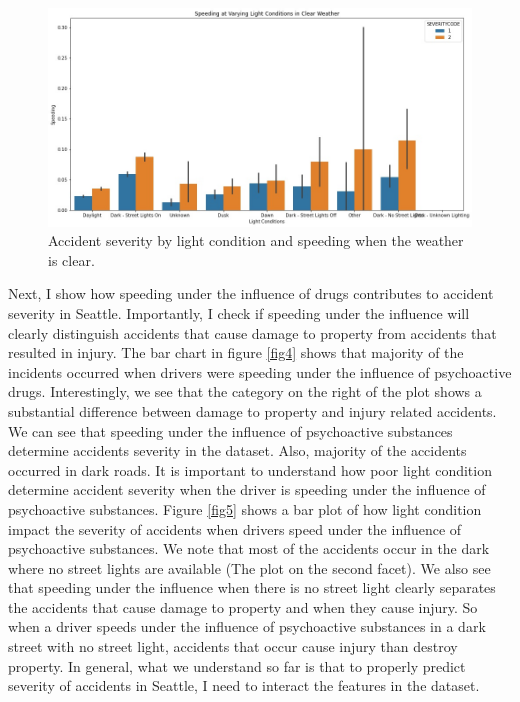 \documentclass[a4paper,12pt]{article}
\begin{document}
\begin{figure}[H]
	\centering
	\includegraphics[width=1.0\textwidth]{li_sp_wet.jpg}
	\caption{Accident severity by light condition and speeding when the weather is clear.}
	\label{fig3}
\end{figure}

Next, I show how speeding under the influence of drugs contributes to accident severity in Seattle. Importantly, I check if speeding under the influence will clearly distinguish accidents that cause damage to property from accidents that resulted in injury. The bar chart in figure \ref{fig4} shows that majority of the incidents occurred when drivers were speeding under the influence of psychoactive drugs. Interestingly, we see that the category on the right of the plot shows a substantial difference between damage to property and injury related accidents.\\

We can see that speeding under the influence of psychoactive substances determine accidents severity in the dataset. Also, majority of the accidents occurred in dark roads. It is important to understand how poor light condition determine accident severity when the driver is speeding under the influence of psychoactive substances. Figure \ref{fig5} shows a bar plot of how light condition impact the severity of accidents when drivers speed under the influence of psychoactive substances. We note that most of the accidents occur in the dark where no street lights are available (The plot on the second facet). We also see that speeding under the influence when there is no street light clearly separates the accidents that cause damage to property and when they cause injury. So when a driver speeds under the influence of psychoactive substances in a dark street with no street light, accidents that occur cause injury than destroy property. In general, what we understand so far is that to properly predict severity of accidents in Seattle, I need to interact the features in the dataset. \\
\end{document}
